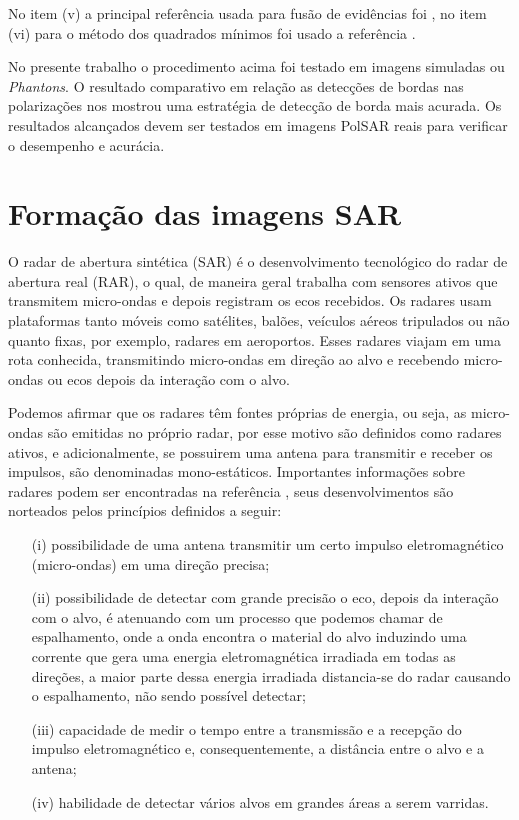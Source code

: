 No item (v) a principal referência usada para fusão de evidências foi \citet{mit}, no item (vi) para o método dos quadrados mínimos foi usado a referência \citep{demmel}.

No presente trabalho o procedimento acima foi testado em imagens simuladas ou \textit{Phantons}. O resultado comparativo em relação as detecções de bordas nas polarizações nos mostrou uma estratégia de detecção de borda mais acurada. Os resultados alcançados devem ser testados em imagens PolSAR reais para verificar o desempenho e acurácia. 
\section{ Formação das imagens SAR}
O radar de abertura sintética (SAR) é o desenvolvimento tecnológico do radar de abertura real (RAR), o qual, de maneira geral trabalha com sensores ativos que transmitem micro-ondas e depois registram os ecos recebidos. Os radares usam plataformas tanto móveis como satélites, balões, veículos aéreos tripulados ou não quanto fixas, por exemplo, radares em aeroportos. Esses radares viajam em uma rota conhecida, transmitindo micro-ondas em direção ao alvo e recebendo micro-ondas ou ecos depois da interação com o alvo. 

Podemos afirmar que os radares têm fontes próprias de energia, ou seja, as micro-ondas são emitidas no próprio radar, por esse motivo são definidos como radares ativos, e adicionalmente, se possuirem uma antena para transmitir e receber os impulsos, são denominadas mono-estáticos. Importantes informações sobre radares podem ser encontradas na referência \citep{lp}, seus desenvolvimentos são norteados pelos princípios definidos a seguir:
\begin{itemize}
\item[(i)] possibilidade de uma antena transmitir um certo impulso eletromagnético (micro-ondas) em uma direção precisa; 
\item[(ii)] possibilidade de detectar com grande precisão o eco, depois da interação com o alvo, é atenuando com um processo que podemos chamar de espalhamento, onde a onda encontra o material do alvo induzindo uma corrente que gera uma energia eletromagnética irradiada em todas as direções, a maior parte dessa energia irradiada distancia-se do radar causando o espalhamento, não sendo possível detectar;
\item[(iii)] capacidade de medir o tempo entre a transmissão  e a recepção do impulso eletromagnético e, consequentemente, a distância entre o alvo e a antena;
\item[(iv)] habilidade de detectar vários alvos em grandes áreas a serem varridas.
\end{itemize}

